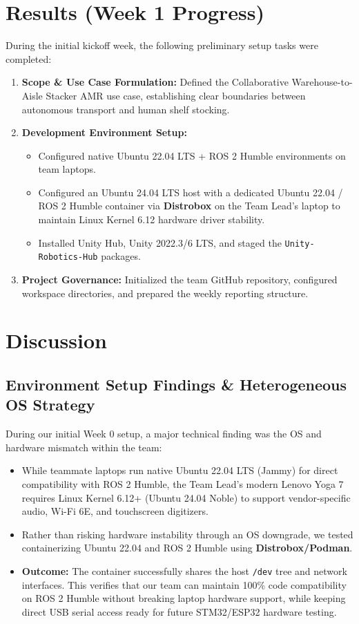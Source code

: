 \documentclass[12pt,a4paper]{article}
\begin{document}
\section{Results (Week 1 Progress)}
During the initial kickoff week, the following preliminary setup tasks were completed:
\begin{enumerate}
    \item \textbf{Scope \& Use Case Formulation:} Defined the Collaborative Warehouse-to-Aisle Stacker AMR use case, establishing clear boundaries between autonomous transport and human shelf stocking.
    \item \textbf{Development Environment Setup:}
    \begin{itemize}
        \item Configured native Ubuntu 22.04 LTS + ROS 2 Humble environments on team laptops.
        \item Configured an Ubuntu 24.04 LTS host with a dedicated Ubuntu 22.04 / ROS 2 Humble container via \textbf{Distrobox} on the Team Lead's laptop to maintain Linux Kernel 6.12 hardware driver stability.
        \item Installed Unity Hub, Unity 2022.3/6 LTS, and staged the \texttt{Unity-Robotics-Hub} packages.
    \end{itemize}
    \item \textbf{Project Governance:} Initialized the team GitHub repository, configured workspace directories, and prepared the weekly reporting structure.
\end{enumerate}

\section{Discussion}

\subsection{Environment Setup Findings \& Heterogeneous OS Strategy}
During our initial Week 0 setup, a major technical finding was the OS and hardware mismatch within the team:
\begin{itemize}
    \item While teammate laptops run native Ubuntu 22.04 LTS (Jammy) for direct compatibility with ROS 2 Humble, the Team Lead's modern Lenovo Yoga 7 requires Linux Kernel 6.12+ (Ubuntu 24.04 Noble) to support vendor-specific audio, Wi-Fi 6E, and touchscreen digitizers.
    \item Rather than risking hardware instability through an OS downgrade, we tested containerizing Ubuntu 22.04 and ROS 2 Humble using \textbf{Distrobox/Podman}. 
    \item \textbf{Outcome:} The container successfully shares the host \texttt{/dev} tree and network interfaces. This verifies that our team can maintain 100\% code compatibility on ROS 2 Humble without breaking laptop hardware support, while keeping direct USB serial access ready for future STM32/ESP32 hardware testing.
\end{itemize}
\end{document}
